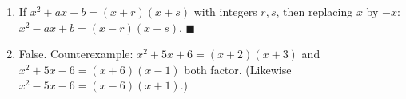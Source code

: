 \begin{enumerate}
\item If $x^2+ax+b=(x+r)(x+s)$ with integers $r,s$, then replacing $x$ by $-x$: $x^2-ax+b=(x-r)(x-s)$. $\blacksquare$
\item False. Counterexample: $x^2+5x+6=(x+2)(x+3)$ and $x^2+5x-6=(x+6)(x-1)$ both factor. (Likewise $x^2-5x-6=(x-6)(x+1)$.)
\end{enumerate}
